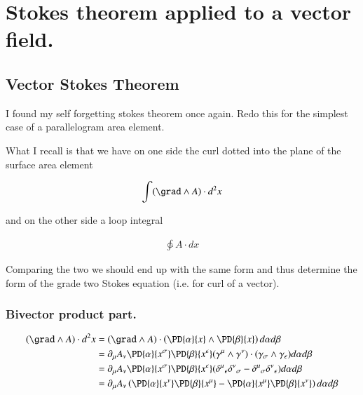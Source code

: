 %

\usepackage{txfonts}

\chapter{Stokes theorem applied to a vector field.}
\label{chap:stokesGradeTwo}
\date{July 17, 2009}

\beginArtWithToc

\section{Vector Stokes Theorem}

I found my self forgetting stokes theorem once again.  Redo this for the simplest case of a parallelogram area element.

What I recall is that we have on one side the curl dotted into the plane of the surface area element

\begin{align}
\int ( \grad \wedge A ) \cdot d^2 x
\end{align}

and on the other side a loop integral

\begin{align}
\ointctrclockwise A \cdot dx
\end{align}

Comparing the two we should end up with the same form and thus determine the form of the grade two Stokes equation (i.e. for curl of a vector).

\subsection{Bivector product part.}

\begin{align*}
( \grad \wedge A ) \cdot d^2 x 
&=
( \grad \wedge A ) \cdot \left(\PD{\alpha}{x} \wedge \PD{\beta}{x}\right) 
d\alpha d\beta \\
&=
\partial_\mu A_\nu \PD{\alpha}{x^\sigma} \PD{\beta}{x^\epsilon} (\gamma^\mu \wedge \gamma^\nu) \cdot (\gamma_\sigma \wedge \gamma_\epsilon) 
d\alpha d\beta \\
&=
\partial_\mu A_\nu \PD{\alpha}{x^\sigma} \PD{\beta}{x^\epsilon} ( {\delta^\mu}_\epsilon {\delta^\nu}_\sigma - {\delta^\mu}_\sigma {\delta^\nu}_\epsilon ) 
d\alpha d\beta \\
&=
\partial_\mu A_\nu \left( \PD{\alpha}{x^\nu} \PD{\beta}{x^\mu} - \PD{\alpha}{x^\mu} \PD{\beta}{x^\nu} \right) 
d\alpha d\beta \\
\end{align*}

